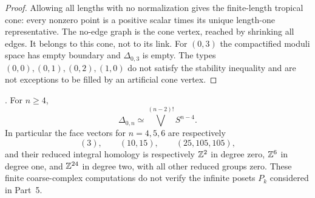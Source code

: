 \begin{proof}
Allowing all lengths with no normalization gives the finite-length tropical cone: every nonzero point is a positive scalar times its unique length-one representative. The no-edge graph is the cone vertex, reached by shrinking all edges. It belongs to this cone, not to its link. For $(0,3)$ the compactified moduli space has empty boundary and $\Delta_{0,3}$ is empty. The types $(0,0),(0,1),(0,2),(1,0)$ do not satisfy the stability inequality and are not exceptions to be filled by an artificial cone vertex.
\end{proof}

\begin{theorem}
\label{P4d2}
. For $n\ge4$,
\[
 \Delta_{0,n}\simeq\bigvee^{(n-2)!}S^{n-4}.
\]
In particular the face vectors for $n=4,5,6$ are respectively
\[
 (3),\qquad(10,15),\qquad(25,105,105),
\]
and their reduced integral homology is respectively $\mathbb Z^2$ in degree zero, $\mathbb Z^6$ in degree one, and $\mathbb Z^{24}$ in degree two, with all other reduced groups zero. These finite coarse-complex computations do not verify the infinite posets $P_k$ considered in Part~5.
\end{theorem}
